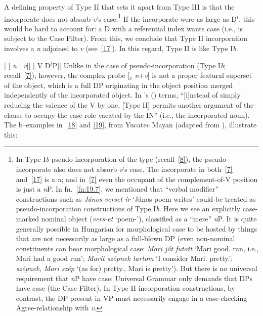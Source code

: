 \documentclass[output=paper]{langsci/langscibook}
\begin{document}
\begin{refcontext}
A defining property of Type II that sets it apart from Type III is that the incorporate does not
absorb \emph{v}'s case.\footnote{In Type I\emph{b} pseudo-incorporation of the
     type (recall~\eqref{8}), the pseudo-incorporate also does not absorb
\emph{v}'s case. The incorporate in both~\eqref{7} and~\eqref{17} is a \emph{n}; and in~\eqref{7} even the occupant of the complement-of-V position is
just a \emph{n}P. In fn.\ \ref{fn:19.7}, we mentioned that  \enquote{verbal modifier}
constructions such as \emph{János verset ír} \enquote*{János poem writes} could be
treated as pseudo-incorporation constructions of Type I\emph{b}. Here we see an
explicitly case-marked nominal object (\emph{vers-et} \enquote*{poem-\Acc{}}),
classified as a \enquote{mere} \emph{n}P. It is quite generally possible in
Hungarian for morphological case to be hosted by things that are not
necessarily as large as a full-blown DP (even non-nominal constituents can bear
morphological case: \emph{Mari jót futott} \enquote*{Mari good.\Acc{} ran,
i.e., Mari had a good run}; \emph{Marit szépnek tartom} \enquote*{I consider
Mari.\Acc{} pretty.\Dat{}}; \emph{szépnek, Mari szép} \enquote*{(as for)
pretty.\Dat{}, Mari is pretty}). But there is no universal requirement
that \emph{n}P have case: Universal Grammar only demands that DPs have case
(the Case Filter). In Type II incorporation constructions, by contrast, the DP
present in VP must necessarily engage in a case-checking
Agree-relationship
with \emph{v}.\label{fn:19.13}} If the incorporate were as large as D$^i$, this would be hard
to account for: a D with a referential index wants case (i.e., is subject to
the Case Filter). From this, we conclude that Type II incorporation involves a
\emph{n} adjoined to \emph{v} (see~\eqref{17}). In this regard, Type II is like
Type I\emph{b}.

\ea  {}[ [ \emph{n}\tss{\{[+N]\}} [ \hspace{-.7ex}\emph{v}\tss{\{[+V], \Acc{}, \ldots{}\}}]]\tss{\{\{[+N]\}, \{[+V], \Acc{}, \ldots{}\}\}} [ V D$^i$P]]\label{17}
\z
Unlike in the case of pseudo-incorporation (Type I\emph{b}; recall~\eqref{7}),
however, the complex probe [$_v$ \emph{n}+\emph{v}] is not a proper featural
superset of the object, which is a full DP originating in the object position
merged independently of the incorporated object. In \citeauthor{mithun84}'s
(\citeyear[859]{mithun84}) terms, \enquote{[i]nstead of simply reducing the
valence of the V by one, [Type II] permits another argument of the clause to
occupy the case role vacated by the IN} (i.e., the incorporated noun). The
b–examples in~\eqref{18} and \eqref{19}, from Yucatec Mayan (adapted from
\citealt[858]{mithun84}), illustrate this:


\end{refcontext}
\end{document}
